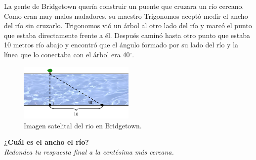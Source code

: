 \question[25]  La gente de Bridgetown quería construir un puente que cruzara un río cercano.
Como eran muy malos nadadores, su maestro Trigonomos aceptó medir el ancho del río sin cruzarlo.
Trigonomos vió un árbol al otro lado del río y marcó el punto que estaba directamente frente a él.
Después caminó hasta otro punto que estaba 10 metros río abajo y encontró que el ángulo formado
por su lado del río y la línea que lo conectaba con el árbol era 40$^\circ$.\\
\begin{figure}[H]
    \begin{center}
        \includegraphics[width=0.5\textwidth]{../images/river1.png}
    \end{center}
    \caption{Imagen satelital del rio en Bridgetown.}
    \label{fig:river1}
\end{figure}
\textbf{¿Cuál es el ancho el río?}\\
\textit{Redondea tu respuesta final a la centésima más cercana.}
